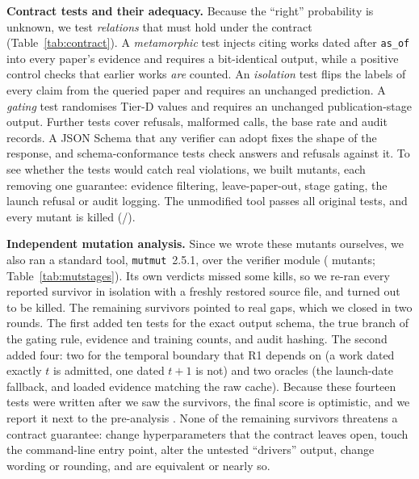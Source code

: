 \documentclass[conference]{IEEEtran}
\begin{document}
\textbf{Contract tests and their adequacy.} Because the ``right'' probability is unknown, we test \emph{relations} that must hold under the contract (Table~\ref{tab:contract}). A \emph{metamorphic} test injects citing works dated after \texttt{as\_of} into every paper's evidence and requires a bit-identical output, while a positive control checks that earlier works \emph{are} counted. An \emph{isolation} test flips the labels of every claim from the queried paper and requires an unchanged prediction. A \emph{gating} test randomises Tier-D values and requires an unchanged publication-stage output. Further tests cover refusals, malformed calls, the base rate and audit records. A JSON Schema that any verifier can adopt fixes the shape of the response, and schema-conformance tests check answers and refusals against it. To see whether the tests would catch real violations, we built \nMutants{} mutants, each removing one guarantee: evidence filtering, leave-paper-out, stage gating, the launch refusal or audit logging. The unmodified tool passes all \nTests{} original tests, and every mutant is killed (\nKilled{}/\nMutants{}).

\textbf{Independent mutation analysis.} Since we wrote these mutants ourselves, we also ran a standard tool, \texttt{mutmut}~2.5.1, over the verifier module (\mutTotal{} mutants; Table~\ref{tab:mutstages}). Its own verdicts missed some kills, so we re-ran every reported survivor in isolation with a freshly restored source file, and \mutMissed{} turned out to be killed. The remaining survivors pointed to real gaps, which we closed in two rounds. The first added ten tests for the exact output schema, the true branch of the gating rule, evidence and training counts, and audit hashing. The second added four: two for the temporal boundary that R1 depends on (a work dated exactly $t$ is admitted, one dated $t{+}1$ is not) and two oracles (the launch-date fallback, and loaded evidence matching the raw cache). Because these fourteen tests were written after we saw the survivors, the final score is optimistic, and we report it next to the pre-analysis \mutVoneScore{}. None of the \mutSurv{} remaining survivors threatens a contract guarantee: \mutClsModelHyperparameters{} change hyperparameters that the contract leaves open, \mutClsCliEntryPoint{} touch the command-line entry point, \mutClsExplanationDrivers{} alter the untested ``drivers'' output, \mutClsMessageOrRounding{} change wording or rounding, and \mutClsEquivalent{} are equivalent or nearly so.
\end{document}
